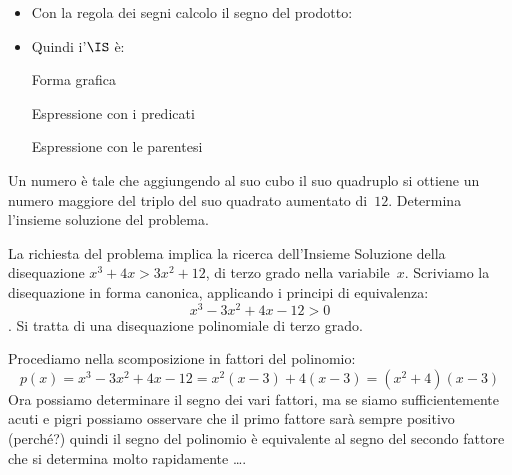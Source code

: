 \begin{esempio}
\begin{itemize}
 \item 
 \vspace{-1em}
 Con la regola dei segni calcolo il segno del prodotto:

\begin{inaccessibleblock}
  \begin{center}
  \segnoprodottob
  \end{center}
\end{inaccessibleblock}

 \item 
 \vspace{-1em}
 Quindi i'\(\IS\) è:\\

  \begin{minipage}{.32\textwidth}
  Forma grafica\\[-1.2em]
  
\begin{inaccessibleblock}
  \begin{center}
  \end{center}
\end{inaccessibleblock}
\vspace{.1em}

  \end{minipage}
  \begin{minipage}{.32\textwidth}
  Espressione con i predicati\\[2.5em]
  
  \end{minipage}
  \begin{minipage}{.32\textwidth}
  Espressione con le parentesi\\[2.5em]
  
  \end{minipage}
  
\end{itemize}

\end{esempio}

\begin{esempio}
Un numero è tale che aggiungendo al suo cubo il suo quadruplo si ottiene 
un numero maggiore del triplo del suo quadrato aumentato di~\(12\). Determina 
l'insieme soluzione del problema.

La richiesta del problema implica la ricerca dell'Insieme Soluzione della 
disequazione \(x^3+4x>3x^2+12\), di terzo grado nella variabile~\(x\). 
Scriviamo la disequazione in forma canonica, applicando i principi di 
equivalenza: 
\[x^3-3x^2+4x-12>0\]. 
Si tratta di una disequazione polinomiale di terzo grado.

Procediamo nella scomposizione in fattori del polinomio:
\[p(x)=x^3-3x^2+4x-12 = x^2 \left(x-3\right)+4 \left(x-3\right) =
      \left(x^2+4\right) \left(x-3\right)\]
Ora possiamo determinare il segno dei vari fattori, ma se siamo 
sufficientemente acuti e pigri possiamo osservare che il primo fattore sarà 
sempre positivo (perché?) quindi il segno del polinomio è equivalente al 
segno del secondo fattore che si determina molto rapidamente \dots.
\end{esempio}

